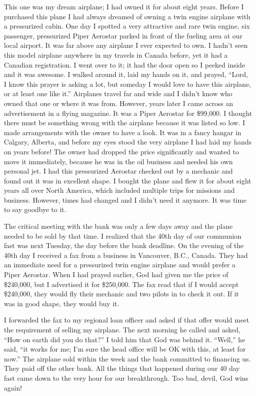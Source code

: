 \documentclass[twoside, 12pt]{book}
\begin{document}
This one was my dream airplane; I had owned it for about eight years. Before I purchased this plane I had always dreamed of owning a twin engine airplane with a pressurized cabin. One day I spotted a very attractive and rare twin engine, six passenger, pressurized Piper Aerostar parked in front of the fueling area at our local airport. It was far above any airplane I ever expected to own. I hadn’t seen this model airplane anywhere in my travels in Canada before, yet it had a Canadian registration. I went over to it; it had the door open so I peeked inside and it was awesome. I walked around it, laid my hands on it, and prayed, “Lord, I know this prayer is asking a lot, but someday I would love to have this airplane, or at least one like it.” Airplanes travel far and wide and I didn’t know who owned that one or where it was from. However, years later I came across an advertisement in a flying magazine. It was a Piper Aerostar for \$99,000. I thought there must be something wrong with the airplane because it was listed so low. I made arrangements with the owner to have a look. It was in a fancy hangar in Calgary, Alberta, and before my eyes stood the very airplane I had laid my hands on years before! The owner had dropped the price significantly and wanted to move it immediately, because he was in the oil business and needed his own personal jet. I had this pressurized Aerostar checked out by a mechanic and found out it was in excellent shape. I bought the plane and flew it for about eight years all over North America, which included multiple trips for missions and business. However, times had changed and I didn’t need it anymore. It was time to say goodbye to it.

The critical meeting with the bank was only a few days away and the plane needed to be sold by that time. I realized that the 40th day of our communion fast was next Tuesday, the day before the bank deadline. On the evening of the 40th day I received a fax from a business in Vancouver, B.C., Canada. They had an immediate need for a pressurized twin engine airplane and would prefer a Piper Aerostar. When I had prayed earlier, God had given me the price of \$240,000, but I advertised it for \$250,000. The fax read that if I would accept \$240,000, they would fly their mechanic and two pilots in to check it out. If it was in good shape, they would buy it. 

I forwarded the fax to my regional loan officer and asked if that offer would meet the requirement of selling my airplane. The next morning he called and asked, “How on earth did you do that?” I told him that God was behind it. “Well,” he said, “it works for me; I’m sure the head office will be OK with this, at least for now.” The airplane sold within the week and the bank committed to financing us. They paid off the other bank. All the things that happened during our 40 day fast came down to the very hour for our breakthrough. Too bad, devil, God wins again! 
\end{document}
